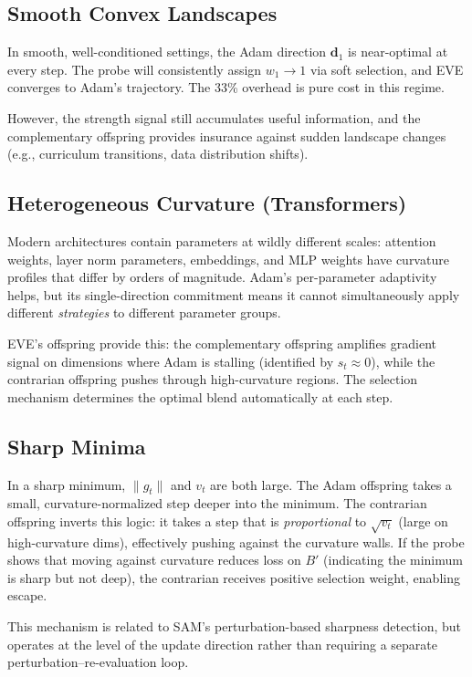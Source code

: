 \documentclass[12pt]{article}
\begin{document}
\subsection{Smooth Convex Landscapes}

In smooth, well-conditioned settings, the Adam direction $\mathbf{d}_1$
is near-optimal at every step.
The probe will consistently assign $w_1 \to 1$ via soft selection, and
EVE converges to Adam's trajectory.
The 33\% overhead is pure cost in this regime.

However, the strength signal still accumulates useful information, and
the complementary offspring provides insurance against sudden landscape
changes (e.g., curriculum transitions, data distribution shifts).

\subsection{Heterogeneous Curvature (Transformers)}

Modern architectures contain parameters at wildly different scales:
attention weights, layer norm parameters, embeddings, and MLP weights
have curvature profiles that differ by orders of magnitude.
Adam's per-parameter adaptivity helps, but its single-direction
commitment means it cannot simultaneously apply different
\emph{strategies} to different parameter groups.

EVE's offspring provide this: the complementary offspring amplifies
gradient signal on dimensions where Adam is stalling (identified by
$s_t \approx 0$), while the contrarian offspring pushes through
high-curvature regions.
The selection mechanism determines the optimal blend automatically
at each step.

\subsection{Sharp Minima}

In a sharp minimum, $\|g_t\|$ and $v_t$ are both large.
The Adam offspring takes a small, curvature-normalized step deeper
into the minimum.
The contrarian offspring inverts this logic: it takes a step that is
\emph{proportional} to $\sqrt{v_t}$ (large on high-curvature dims),
effectively pushing against the curvature walls.
If the probe shows that moving against curvature reduces loss on $B'$
(indicating the minimum is sharp but not deep), the contrarian receives
positive selection weight, enabling escape.

This mechanism is related to SAM's perturbation-based sharpness
detection, but operates at the level of the update direction rather
than requiring a separate perturbation--re-evaluation loop.
\end{document}
